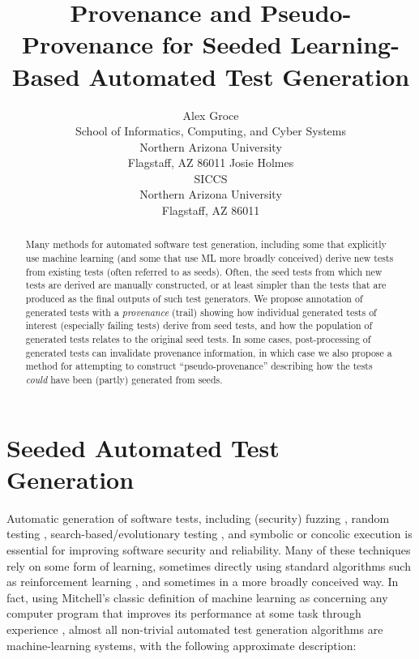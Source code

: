 \documentclass[final]{article}
\title{Provenance and Pseudo-Provenance for Seeded Learning-Based Automated Test Generation}
\author{
Alex Groce\\
School of Informatics, Computing, and Cyber Systems\\
Northern Arizona University\\
Flagstaff, AZ 86011
\And
Josie Holmes\\
SICCS\\
Northern Arizona University\\
Flagstaff, AZ 86011
}
\begin{document}

\maketitle

\begin{abstract}
  Many methods for automated software test generation, including some that
  explicitly use machine learning (and some that use ML more broadly
  conceived) derive new tests from existing tests (often referred to
  as seeds).  Often, the seed tests
  from which new tests are derived are manually constructed, or at least
  simpler than the tests that are produced as the final outputs of
  such test generators.  We
  propose annotation of generated tests with a \emph{provenance} (trail) showing
  how individual generated tests of interest (especially failing tests) derive
  from seed tests, and how the population of generated tests relates
  to the original seed tests.  In some cases, post-processing of
  generated tests can invalidate provenance information, in which case
  we also propose a method for attempting to construct
  ``pseudo-provenance'' describing how the tests \emph{could} have
  been (partly) generated from seeds.
\end{abstract}

\section{Seeded Automated Test Generation}

Automatic generation of software tests, including (security) fuzzing
\cite{aflfuzz,TrailBitsSeeded}, random testing \cite{csmith,ICSEDiff,Pacheco},
search-based/evolutionary testing \cite{FA11},
and symbolic or concolic execution
\cite{Whitebox,GodefroidKS05,KLEE,Person:2011:DIS:1993498.1993558,Marinescu:2012:MTS:2337223.2337308,issta14}
is essential for improving software security and reliability.  Many of
these techniques rely on some form of learning, sometimes directly
using standard algorithms
\cite{last2004artificial,Raffelt:2007:DTV:1787497.1787516,ARTChen,Groce:2002:AMC:646486.694482}
such as reinforcement learning \cite{ISSRE,ISOLA12,ReinforceBook}, and sometimes in a more broadly conceived
way.  In fact, using Mitchell's classic definition of machine learning
as concerning any computer program that improves its performance at some
task through experience \cite{Mitchell}, almost all non-trivial automated test generation
algorithms are machine-learning systems, with the following
approximate description:
\end{document}
